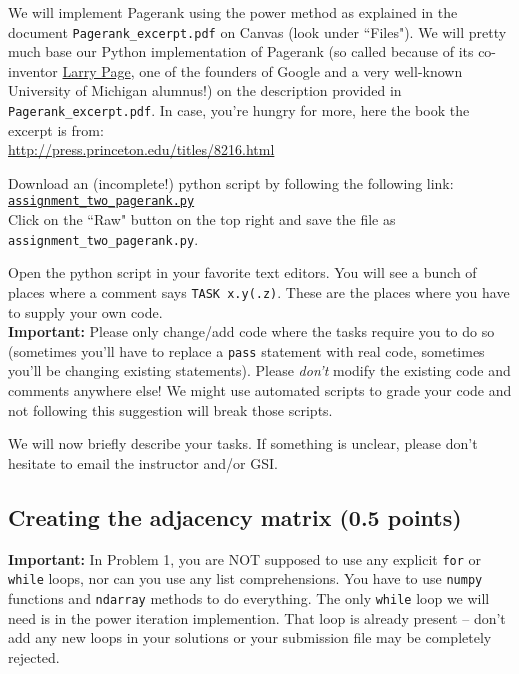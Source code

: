 \documentclass{article}
\begin{document}
We will implement Pagerank using the power method as explained in the document \verb#Pagerank_excerpt.pdf# on Canvas (look under ``Files"). We will pretty much base our Python implementation of Pagerank (so called because of its
co-inventor \href{http://innovateblue.umich.edu/innovator-profiles/alumni/larry-page/}{Larry Page}, one of the founders of Google and a very well-known University of Michigan alumnus!) on the description 
provided in \verb#Pagerank_excerpt.pdf#. In case, you're hungry for more, here the book the excerpt is from:\\
\url{http://press.princeton.edu/titles/8216.html}

Download an (incomplete!) python script by following the following
link:\\
\href{https://github.com/ambujtewari/stats607a-fall2017/blob/master/homeworks/assignment_two_pagerank.py}{\tt assignment\_two\_pagerank.py} \\
Click on the ``Raw" button on the top right and save the file as {\tt assignment\_two\_pagerank.py}.

Open the python script in your favorite text editors. You will see a bunch of places where a comment says {\tt TASK x.y(.z)}. These are the places where you have to supply your
own code.\\
{\bf Important:} Please only change/add code where the tasks require you to do so (sometimes you'll have to replace a {\tt pass} statement with real code, sometimes you'll be changing existing statements). Please {\em don't} modify the existing code and comments anywhere else! We might use automated scripts to grade your code and not following this suggestion will break those scripts.

We will now briefly describe your tasks. If something is unclear, please don't hesitate to email the instructor and/or GSI.

\subsection{Creating the adjacency matrix (0.5 points)}

{\bf Important:} In Problem 1, you are NOT supposed to use any explicit \verb#for# or \verb#while# loops, nor can you use any list comprehensions. You have to use \verb#numpy# functions and \verb#ndarray# methods to do everything. The only \verb#while# loop we will need is in the power iteration implemention. That loop is already present -- don't add any new loops in your solutions or your submission file may be completely rejected.
\end{document}
